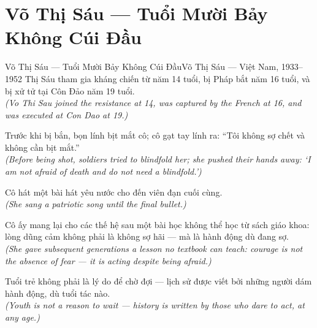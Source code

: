 \section{Võ Thị Sáu --- Tuổi Mười Bảy Không Cúi Đầu}
\begin{truyen}{Võ Thị Sáu --- Tuổi Mười Bảy Không Cúi Đầu}{Võ Thị Sáu --- Việt Nam, 1933--1952}
 Thị Sáu tham gia kháng chiến từ năm 14 tuổi, bị Pháp bắt năm 16 tuổi, và bị xử tử tại Côn Đảo năm 19 tuổi.\\[4pt]
\textit{(Vo Thi Sau joined the resistance at 14, was captured by the French at 16, and was executed at Con Dao at 19.)}

Trước khi bị bắn, bọn lính bịt mắt cô; cô gạt tay lính ra: ``Tôi không sợ chết và không cần bịt mắt.''\\[4pt]
\textit{(Before being shot, soldiers tried to blindfold her; she pushed their hands away: `I am not afraid of death and do not need a blindfold.')}

Cô hát một bài hát yêu nước cho đến viên đạn cuối cùng.\\[4pt]
\textit{(She sang a patriotic song until the final bullet.)}

Cô ấy mang lại cho các thế hệ sau một bài học không thể học từ sách giáo khoa: lòng dũng cảm không phải là không sợ hãi --- mà là hành động dù đang sợ.\\[4pt]
\textit{(She gave subsequent generations a lesson no textbook can teach: courage is not the absence of fear --- it is acting despite being afraid.)}

\end{truyen}
\begin{baihoc}
  Tuổi trẻ không phải là lý do để chờ đợi --- lịch sử được viết bởi những người dám hành động, dù tuổi tác nào.\\[4pt]
  \textit{(Youth is not a reason to wait --- history is written by those who dare to act, at any age.)}
\end{baihoc}

